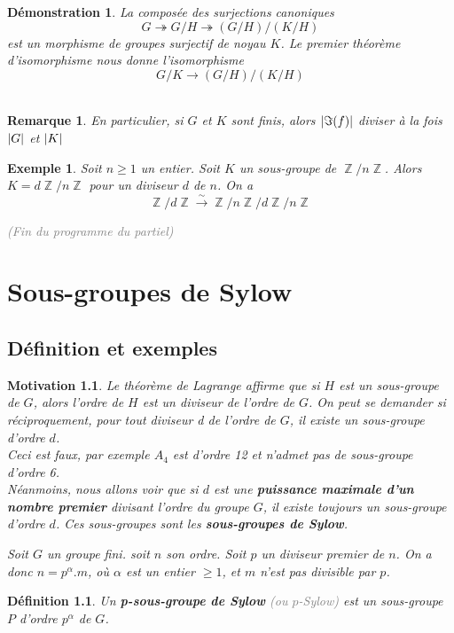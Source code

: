 \documentclass[a4paper, oneside]{report}
\theoremstyle{break}
\newtheorem{definition}[thm]{Définition}
\newtheorem{remar}[thm]{Remarque}
\newtheorem{exemple}[thm]{Exemple}
\newtheorem*{motivation}{Motivation}
\newtheorem*{demo}{Démonstration}
\newcommand{\mdg}{morphisme de groupes }
\newcommand{\isom}{isomorphisme }
\newcommand{\gray}[1]{\textcolor{gray}{#1}}
\newcommand{\fong}{\overset{\sim}{\rightarrow}}
\newcommand{\surj}{\twoheadrightarrow}
\DeclareMathOperator{\Z}{\mathbb{Z}}
\DeclarePairedDelimiter\abs{\lvert}{\rvert}%
\newcommand{\slign}{\textbf}
\begin{document}
\begin{demo}
La composée des surjections canoniques 
$$G\surj G/H \surj (G/H)\big/(K/H)$$
est un \mdg surjectif de noyau $K$. Le premier théorème d'\isom nous donne l'\isom 
$$G/K \rightarrow (G/H)\big/(K/H)$$
~
\end{demo}

\begin{remar}
En particulier, si $G$ et $K$ sont finis, alors $\abs{\Im(f)}$ diviser à la fois $\abs{G}$ et $\abs{K}$ 
\end{remar}

\begin{exemple}
Soit $n \geq 1$ un entier. Soit $K$ un sous-groupe de $\Z/n\Z$. Alors $K = d \Z/n\Z$ pour un diviseur $d$ de $n$. On a
\[
\Z/d\Z \fong \Z/n\Z \big/ d\Z/n\Z
\]

\gray{(Fin du programme du partiel)}
\end{exemple}

\chapter{Sous-groupes de Sylow}

\section{Définition et exemples}

\begin{motivation}
Le théorème de Lagrange affirme que si $H$ est un sous-groupe de $G$, alors l'ordre de $H$ est un diviseur de l'ordre de $G$. On peut se demander si réciproquement, pour tout diviseur d de l'ordre de $G$, il existe un sous-groupe d'ordre $d$.\\
Ceci est faux, par exemple $A_4$ est d'ordre 12 et n'admet pas de sous-groupe d'ordre 6.\\
Néanmoins, nous allons voir que si $d$ est une \textbf{puissance maximale d'un nombre premier} divisant l'ordre du groupe $G$, il existe toujours un sous-groupe d'ordre $d$. Ces sous-groupes sont les \textbf{sous-groupes de Sylow}.

\vspace{1em}
\medbreak

Soit $G$ un groupe fini. soit $n$ son ordre. Soit $p$ un diviseur premier de $n$. On a donc $n = p^\alpha . m$, où $\alpha$ est un entier $\geq 1$, et $m$ n'est pas divisible par $p$.
\end{motivation}

\begin{definition}
Un \slign{p-sous-groupe de Sylow} \gray{(ou $p$-Sylow)} est un sous-groupe $P$ d'ordre $p^\alpha$ de $G$.
\end{definition}
\end{document}
